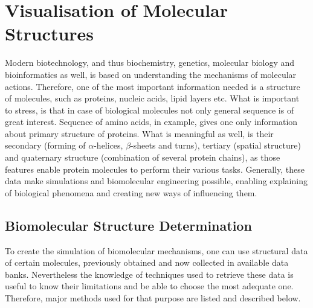 
\chapter{Visualisation of Molecular Structures}\label{chapter2}  %
Modern biotechnology, and thus biochemistry, genetics, molecular biology and bioinformatics as well, is based on understanding the mechanisms of molecular actions. Therefore, one of the most important information needed is a structure of molecules, such as proteins, nucleic acids, lipid layers etc. What is important to stress, is that in case of biological molecules not only general sequence is of great interest. Sequence of amino acids, in example, gives one only information about primary structure of proteins. What is meaningful as well, is their secondary (forming of $\alpha$-helices, $\beta$-sheets and turns), tertiary (spatial structure) and quaternary structure (combination of several protein chains), as those features enable protein molecules to perform their various tasks. Generally, these data make simulations and biomolecular engineering possible, enabling explaining of biological phenomena and creating new ways of influencing them.
\section{Biomolecular Structure Determination} %
To create the simulation of biomolecular mechanisms, one can use structural data of certain molecules, previously obtained and now collected in available data banks. Nevertheless the knowledge of techniques used to retrieve these data is useful to know their limitations and be able to choose the most adequate one. Therefore, major methods used for that purpose are listed and described below.
